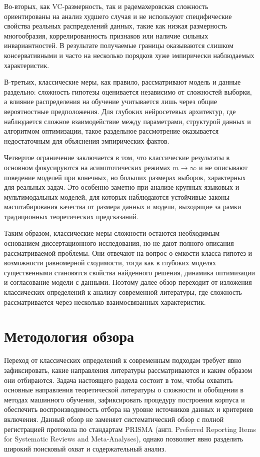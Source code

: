 Во-вторых, как VC-размерность, так и радемахеровская сложность ориентированы на анализ худшего случая и не используют специфические свойства реальных распределений данных, такие как низкая размерность многообразия, коррелированность признаков или наличие сильных инвариантностей. В результате получаемые границы оказываются слишком консервативными и часто на несколько порядков хуже эмпирически наблюдаемых характеристик.

В-третьих, классические меры, как правило, рассматривают модель и данные раздельно: сложность гипотезы оценивается независимо от сложностей выборки, а влияние распределения на обучение учитывается лишь через общие вероятностные предположения. Для глубоких нейросетевых архитектур, где наблюдается сложное взаимодействие между параметрами, структурой данных и алгоритмом оптимизации, такое раздельное рассмотрение оказывается недостаточным для объяснения эмпирических фактов.

Четвертое ограничение заключается в том, что классические результаты в основном фокусируются на асимптотических режимах $m \to \infty$ и не описывают поведение моделей при конечных, но больших размерах выборок, характерных для реальных задач. Это особенно заметно при анализе крупных языковых и мультимодальных моделей, для которых наблюдаются устойчивые законы масштабирования качества от размера данных и модели, выходящие за рамки традиционных теоретических предсказаний.

Таким образом, классические меры сложности остаются необходимым основанием диссертационного исследования, но не дают полного описания рассматриваемой проблемы.
Они отвечают на вопрос о емкости класса гипотез и возможности равномерной сходимости, тогда как в глубоких моделях существенными становятся свойства найденного решения, динамика оптимизации и согласование модели с данными.
Поэтому далее обзор переходит от изложения классических определений к анализу современной литературы, где сложность рассматривается через несколько взаимосвязанных характеристик.

\section{Методология обзора}

Переход от классических определений к современным подходам требует явно зафиксировать, какие направления литературы рассматриваются и каким образом они отбираются.
Задача настоящего раздела состоит в том, чтобы охватить основные направления теоретической литературы о сложности и обобщении в методах машинного обучения, зафиксировать процедуру построения корпуса и обеспечить воспроизводимость отбора на уровне источников данных и критериев включения.
Данный обзор не заменяет систематический обзор с полной регистрацией протокола по стандартам PRISMA (англ. Preferred Reporting Items for Systematic Reviews and Meta-Analyses), однако позволяет явно разделить широкий поисковый охват и содержательный анализ.

